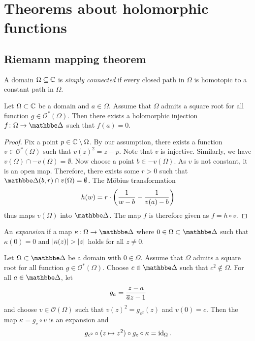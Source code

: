 \section{Theorems about holomorphic functions}

\subsection{Riemann mapping theorem}


\begin{definicija}
A domain $\Omega \subseteq \mathbb{C}$ is
\emph{simply connected} if every closed
path in $\Omega$ is homotopic to a constant path in $\Omega$.
\end{definicija}

\begin{lema}
\label{thm_hol:lm:inj_exis}
Let $\Omega \subset \mathbb{C}$ be a domain and $a \in \Omega$. Assume that
$\Omega$ admits a square root for all function
$g \in \mathcal{O}^*(\Omega)$. Then there exists a holomorphic
injection $f \colon \Omega \to \dsk$ such that $f(a) = 0$.
\end{lema}

\begin{proof}
Fix a point $p \in \mathbb{C} \setminus \Omega$. By our assumption, there
exists a function $v \in \mathcal{O}^*(\Omega)$ such that
$v(z)^2 = z-p$. Note that $v$ is injective. Similarly, we have
$v(\Omega) \cap -v(\Omega) = \emptyset$. Now choose a point
$b \in -v(\Omega)$. As $v$ is not constant, it is an open map.
Therefore, there exists some $r > 0 $ such that
$\dsk(b, r) \cap v(\Omega) = \emptyset$. The Möbius transformation
\[
h(w) = r \cdot \left(\frac{1}{w-b} - \frac{1}{v(a)-b}\right)
\]
thus maps $v(\Omega)$ into $\dsk$. The map $f$ is therefore given
as $f = h \circ v$.
\end{proof}

\begin{definicija}
An \emph{expansion} if a map
$\kappa \colon \Omega \to \dsk$ where $0 \in \Omega \subset \dsk$
such that $\kappa(0) = 0$ and $\left\lvert \kappa(z)\right\rvert > \left\lvert z\right\rvert$ holds for
all $z \ne 0$.
\end{definicija}

\begin{lema}
Let $\Omega \subset \dsk$ be a domain with $0 \in \Omega$. Assume
that $\Omega$ admits a square root for all function
$g \in \mathcal{O}^*(\Omega)$. Choose $c \in \dsk$ such that
$c^2 \not \in \Omega$. For all $a \in \dsk$, let
\[
g_a = \frac{z - a}{\overline{a} z - 1}
\]
and choose $v \in \mathcal{O}(\Omega)$ such that
$v(z)^2 = g_{c^2}(z)$ and $v(0) = c$. Then the map
$\kappa = g_c \circ v$ is an expansion and
\[
g_{c^2} \circ (z \mapsto z^2) \circ g_c \circ \kappa =
\operatorname{id}_{\Omega}.
\]
\end{lema}

